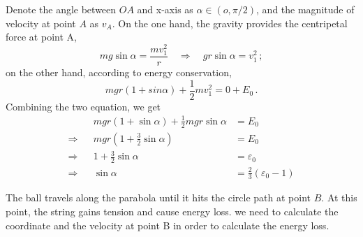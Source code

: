 \documentclass[]{article}
\begin{document}
Denote the angle between $OA$ and x-axis as $\alpha \in (o, \pi/2)$, and the magnitude of velocity at point $A$ as $v_A$. On the one hand, the gravity provides the centripetal force at point A,
\[
mg\sin\alpha = \frac{mv_1^2}{r}  \quad\Rightarrow\quad gr\sin\alpha = v_1^2 \,;
\]
on the other hand, according to energy conservation,
\[
mgr(1+sin\alpha) + \frac{1}{2}mv_1^2 = 0 + E_0\,.
\]
Combining the two equation, we get
\begin{align*}
&&mgr(1+\sin\alpha) + \frac{1}{2}mgr\sin\alpha &= E_0 \\
\Rightarrow &&mgr(1 + \frac{3}{2}\sin\alpha) &= E_0 \\
\Rightarrow &&1 + \frac{3}{2}\sin\alpha &= \varepsilon_0 \\
\Rightarrow &&\sin\alpha &= \frac{2}{3}(\varepsilon_0 - 1)
\end{align*}

The ball travels along the parabola until it hits the circle path at point $B$. At this point, the string gains tension and cause energy loss. we need to calculate the coordinate and the velocity at point B in order to calculate the energy loss.
\end{document}
